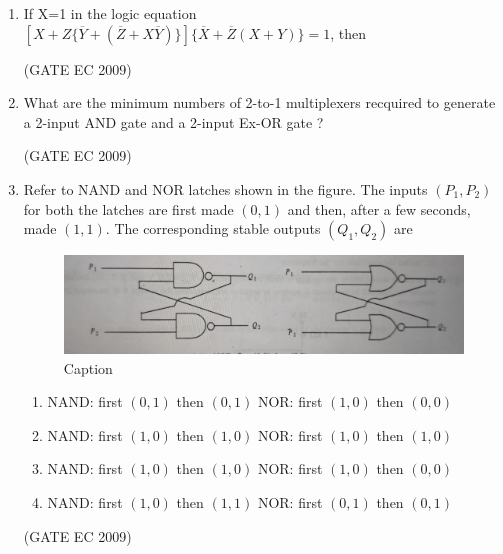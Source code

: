 \documentclass[journal,12pt,onecolumn]{IEEEtran}
\theoremstyle{remark}
\begin{document}
\begin{enumerate}[start=1, label={Q\arabic*.}]
\item If X=1 in the logic equation $[X + Z\{\overline{Y} + (\overline{Z} + X\overline{Y})\}] \{\overline{X} + \overline{Z}(X+Y)\} = 1$, then
\begin{enumerate}[label=(\Alph*)]
\end{enumerate}
\hfill (GATE EC 2009)

\item What are the minimum numbers of 2-to-1 multiplexers recquired to generate a 2-input AND gate and a 2-input Ex-OR gate ?
\begin{enumerate}[label=(\Alph*)]
\end{enumerate}
\hfill (GATE EC 2009)

\item Refer to NAND and NOR latches shown in the figure. The inputs $(P_1,P_2)$ for both the latches are first made $(0,1)$ and then, after a few seconds, made $(1,1)$. The corresponding stable outputs $(Q_1, Q_2)$ are
\begin{figure}[H]
    \centering
    \includegraphics[width=0.5\linewidth]{images/img_16.jpg}
    \caption{Caption}
    \label{fig:placeholder}
\end{figure}
\begin{enumerate}[label=(\Alph*)]
    \item NAND: first $(0,1)$ then $(0,1)$   NOR: first $(1,0)$ then $(0,0)$
    \item NAND: first $(1,0)$ then $(1,0)$   NOR: first $(1,0)$ then $(1,0)$
    \item NAND: first $(1,0)$ then $(1,0)$   NOR: first $(1,0)$ then $(0,0)$
    \item NAND: first $(1,0)$ then $(1,1)$   NOR: first $(0,1)$ then $(0,1)$
\end{enumerate}
\hfill (GATE EC 2009)


\end{enumerate}
\end{document}
